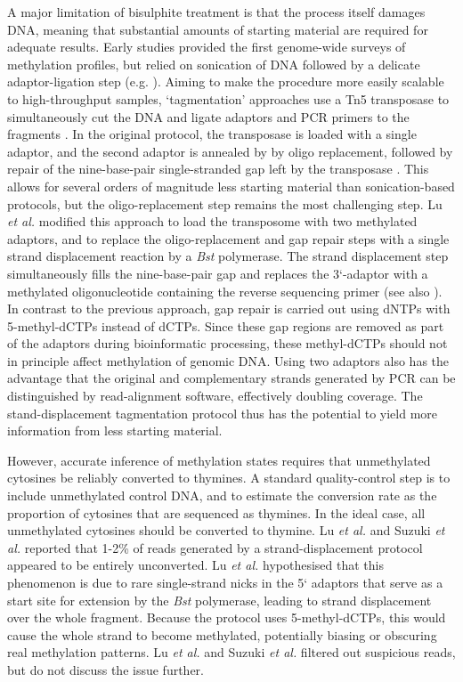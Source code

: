 \documentclass[10pt,draft,letterpaper]{article}
\begin{document}
A major limitation of bisulphite treatment is that the process itself damages DNA, meaning that substantial amounts of starting material are required for adequate results.
Early studies provided the first genome-wide surveys of methylation profiles, but relied on sonication of DNA followed by a delicate adaptor-ligation step (e.g. \cite{meissner2005reduced, cokus2008shotgun, lister2009human}).
Aiming to make the procedure more easily scalable to high-throughput samples, `tagmentation' approaches use a Tn5 transposase to simultaneously cut the DNA and ligate adaptors and PCR primers to the fragments \cite{wang2013tagmentation}.
In the original protocol, the transposase is loaded with a single adaptor, and the second adaptor is annealed by by oligo replacement, followed by repair of the nine-base-pair single-stranded gap left by the transposase \cite{adey2012ultra}.
This allows for several orders of magnitude less starting material than sonication-based protocols, but the oligo-replacement step remains the most challenging step.
Lu \textit{et al.} \cite{lu2015improved} modified this approach to load the transposome with two methylated adaptors, and to replace the oligo-replacement and gap repair steps with a single strand displacement reaction by a \textit{Bst} polymerase.
The strand displacement step simultaneously fills the nine-base-pair gap and replaces the 3`-adaptor with a methylated oligonucleotide containing the
reverse sequencing primer (see also \cite{weichenhan2019generation, suzuki2018whole}).
In contrast to the previous approach, gap repair is carried out using dNTPs with 5-methyl-dCTPs instead of dCTPs.
Since these gap regions are removed as part of the adaptors during bioinformatic processing, these methyl-dCTPs should not in principle affect methylation of genomic DNA.
Using two adaptors also has the advantage that the original and complementary strands generated by PCR can be distinguished by read-alignment software, effectively doubling coverage. 
The stand-displacement tagmentation protocol thus has the potential to yield more information from less starting material.

However, accurate inference of methylation states requires that unmethylated cytosines be reliably converted to thymines.
A standard quality-control step is to include unmethylated control DNA, and to estimate the conversion rate as the proportion of cytosines that are sequenced as thymines.
In the ideal case, all unmethylated cytosines should be converted to thymine.
Lu \textit{et al.} \cite{lu2015improved} and Suzuki \textit{et al.} \cite{suzuki2018whole} reported that 1-2\% of reads generated by a strand-displacement protocol appeared to be entirely unconverted.
Lu \textit{et al.} \cite{lu2015improved} hypothesised that this phenomenon is due to rare single-strand nicks in the 5` adaptors that serve as a start site for extension by the \textit{Bst} polymerase, leading to strand displacement over the whole fragment.
Because the protocol uses 5-methyl-dCTPs, this would cause the whole strand to become methylated, potentially biasing or obscuring real methylation patterns.
Lu \textit{et al.} \cite{lu2015improved} and Suzuki \textit{et al.} \cite{suzuki2018whole} filtered out suspicious reads, but do not discuss the issue further.
\end{document}
